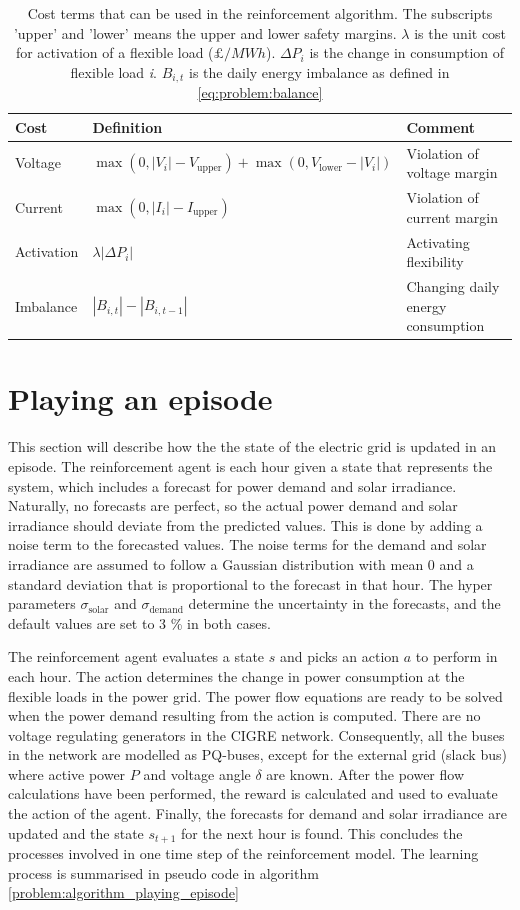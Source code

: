 \documentclass[class=book, crop=false, 11pt]{standalone}
\begin{document}
\begin{table}[ht]
\centering
\caption{Cost terms that can be used in the reinforcement algorithm. The subscripts 'upper' and 'lower' means the upper and lower safety margins. $\lambda$ is the unit cost for activation of a flexible load ($\pounds/MWh$). $\Delta P_{i}$ is the change in consumption of flexible load \textit{i}. $B_{i,t}$ is the daily energy imbalance as defined in \eqref{eq:problem:balance}}
\label{table:reward_terms}
\begin{tabular}{l|ll}

Cost  & Definition & Comment
\\ 
\hline
Voltage &
$\max(0,|V_{i}| - V_{\textrm{upper}}) + \max(0,V_{\textrm{lower}}- |V_{i}|)$ &
Violation of voltage margin
\\
Current &
$\max(0,|I_{i}| - I_{\textrm{upper}})$&
Violation of current margin
\\
Activation &
$\lambda |\Delta P_{i}|$&
Activating flexibility
\\
Imbalance &
$|B_{i,t}|- |B_{i,t-1}|$&
Changing daily energy consumption
\\
\hline
\end{tabular}
\end{table}

\section{Playing an episode}
This section will describe how the the state of the electric grid is updated in an episode. The reinforcement agent is each hour given a state that represents the system, which includes a forecast for power demand and solar irradiance. Naturally, no forecasts are perfect, so the actual power demand and solar irradiance should deviate from the predicted values. This is done by adding a noise term to the forecasted values. The noise terms for the demand and solar irradiance are assumed to follow a Gaussian distribution with mean 0 and a standard deviation that is proportional to the forecast in that hour. The hyper parameters $\sigma_{\textrm{solar}}$ and $\sigma_{\textrm{demand}}$ determine the uncertainty in the forecasts, and the default values are set to 3 \% in both cases.

The reinforcement agent evaluates a state $s$ and picks an action $a$ to perform in each hour. The action determines the change in power consumption at the flexible loads in the power grid. The power flow equations are ready to be solved when the power demand resulting from the action is computed. There are no voltage regulating generators in the CIGRE network. Consequently, all the buses in the network are modelled as PQ-buses, except for the external grid (slack bus) where active power $P$ and voltage angle $\delta$ are known. After the power flow calculations have been performed, the reward is calculated and used to evaluate the action of the agent. Finally, the forecasts for demand and solar irradiance are updated and the state $s_{t+1}$ for the next hour is found. This concludes the processes involved in one time step of the reinforcement model. The learning process is summarised in pseudo code in algorithm \ref{problem:algorithm_playing_episode} 
\end{document}
